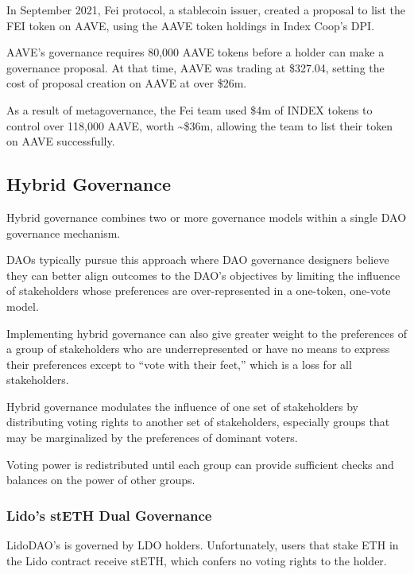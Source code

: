 \documentclass[
]{article}
\begin{document}
In September 2021, Fei protocol, a stablecoin issuer, created a proposal
to list the FEI token on AAVE, using the AAVE token holdings in Index
Coop's DPI.

AAVE's governance requires 80,000 AAVE tokens before a holder can make a
governance proposal. At that time, AAVE was trading at \$327.04, setting
the cost of proposal creation on AAVE at over \$26m.

As a result of metagovernance, the Fei team used \$4m of INDEX tokens to
control over 118,000 AAVE, worth \textasciitilde\$36m, allowing the team
to list their token on AAVE successfully.

\hypertarget{hybrid-governance}{%
\subsection{Hybrid Governance}\label{hybrid-governance}}

Hybrid governance combines two or more governance models within a single
DAO governance mechanism.

DAOs typically pursue this approach where DAO governance designers
believe they can better align outcomes to the DAO's objectives by
limiting the influence of stakeholders whose preferences are
over-represented in a one-token, one-vote model.

Implementing hybrid governance can also give greater weight to the
preferences of a group of stakeholders who are underrepresented or have
no means to express their preferences except to ``vote with their
feet,'' which is a loss for all stakeholders.

Hybrid governance modulates the influence of one set of stakeholders by
distributing voting rights to another set of stakeholders, especially
groups that may be marginalized by the preferences of dominant voters.

Voting power is redistributed until each group can provide sufficient
checks and balances on the power of other groups.

\hypertarget{lidos-steth-dual-governance}{%
\subsubsection{Lido's stETH Dual
Governance}\label{lidos-steth-dual-governance}}

LidoDAO's is governed by LDO holders. Unfortunately, users that stake
ETH in the Lido contract receive stETH, which confers no voting rights
to the holder.
\end{document}
